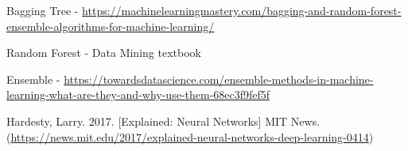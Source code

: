 \documentclass[
  paper=a4,
  ,captions=tableheading
]{scrartcl}
\begin{document}
Bagging Tree -
\url{https://machinelearningmastery.com/bagging-and-random-forest-ensemble-algorithms-for-machine-learning/}

Random Forest - Data Mining textbook

Ensemble -
\url{https://towardsdatascience.com/ensemble-methods-in-machine-learning-what-are-they-and-why-use-them-68ec3f9fef5f}

Hardesty, Larry. 2017. {[}Explained: Neural Networks{]} MIT News.
(\url{https://news.mit.edu/2017/explained-neural-networks-deep-learning-0414})
\end{document}
